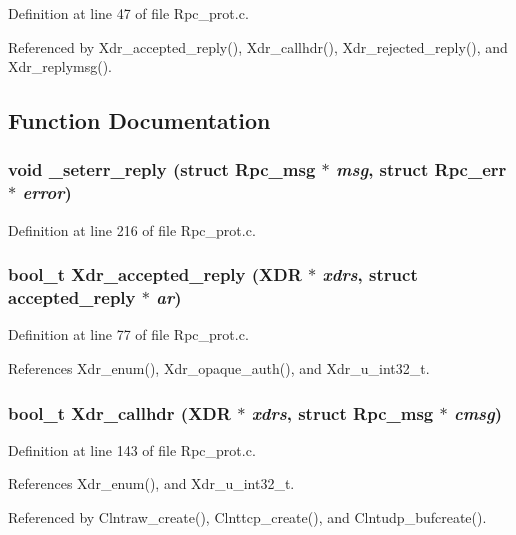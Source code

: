 Definition at line 47 of file Rpc\_\-prot.c.

Referenced by Xdr\_\-accepted\_\-reply(), Xdr\_\-callhdr(), Xdr\_\-rejected\_\-reply(), and Xdr\_\-replymsg().

\subsection{Function Documentation}
\subsubsection{\setlength{\rightskip}{0pt plus 5cm}void \_\-seterr\_\-reply (struct Rpc\_\-msg $\ast$ {\em msg}, struct Rpc\_\-err $\ast$ {\em error})}\label{Rpc__prot_8c_a10}




Definition at line 216 of file Rpc\_\-prot.c.
\subsubsection{\setlength{\rightskip}{0pt plus 5cm}bool\_\-t Xdr\_\-accepted\_\-reply (XDR $\ast$ {\em xdrs}, struct accepted\_\-reply $\ast$ {\em ar})}\label{Rpc__prot_8c_a4}




Definition at line 77 of file Rpc\_\-prot.c.

References Xdr\_\-enum(), Xdr\_\-opaque\_\-auth(), and Xdr\_\-u\_\-int32\_\-t.
\subsubsection{\setlength{\rightskip}{0pt plus 5cm}bool\_\-t Xdr\_\-callhdr (XDR $\ast$ {\em xdrs}, struct Rpc\_\-msg $\ast$ {\em cmsg})}\label{Rpc__prot_8c_a7}




Definition at line 143 of file Rpc\_\-prot.c.

References Xdr\_\-enum(), and Xdr\_\-u\_\-int32\_\-t.

Referenced by Clntraw\_\-create(), Clnttcp\_\-create(), and Clntudp\_\-bufcreate().
